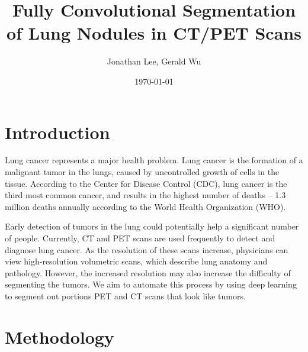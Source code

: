 \documentclass[12pt, letterpaper]{article}
\title{Fully Convolutional Segmentation of Lung Nodules in CT/PET Scans}
\author{Jonathan Lee, Gerald Wu}
\date{\today}
\begin{document}
	\maketitle
	\section{Introduction}
	Lung cancer represents a major health problem. Lung cancer is the formation of a malignant tumor in the lungs, caused by uncontrolled growth of cells in the tissue. According to the Center for Disease Control (CDC), lung cancer is the third most common cancer, and results in the highest number of deaths -- 1.3 million deaths annually according to the World Health Organization (WHO).\par
	Early detection of tumors in the lung could potentially help a significant number of people. Currently, CT and PET scans are used frequently to detect and diagnose lung cancer. As the resolution of these scans increase, physicians can view high-resolution volumetric scans, which describe lung anatomy and pathology. However, the increased resolution may also increase the difficulty of segmenting the tumors. We aim to automate this process by using deep learning to segment out portions PET and CT scans that look like tumors.
	\section{Methodology}
\end{document}
